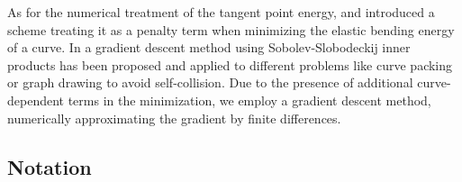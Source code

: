 \documentclass{article}
\begin{document}
As for the numerical treatment of the tangent point energy, \cite{bartels_simple_2018} and \cite{bartels_stability_2018} introduced a scheme treating it as a penalty term when minimizing the elastic bending energy of a curve. In \cite{yu_repulsive_2021} a gradient descent method using Sobolev-Slobodeckij inner products has been proposed and applied to different problems like curve packing or graph drawing to avoid self-collision. Due to the presence of additional curve-dependent terms in the minimization, we employ a gradient descent method, numerically approximating the gradient by finite differences. 



\subsection{Notation}\label{Notation}
\end{document}
